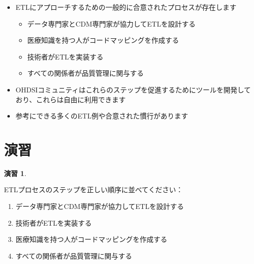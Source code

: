 \documentclass[
  11pt]{book}
\makeatletter
\providecommand{\tightlist}{%
  \setlength{\itemsep}{0pt}\setlength{\parskip}{0pt}}
\newenvironment{kframe}{%
\medskip{}
\setlength{\fboxsep}{.8em}
 \def\at@end@of@kframe{}%
 \ifinner\ifhmode%
  \def\at@end@of@kframe{\end{minipage}}%
  \begin{minipage}{\columnwidth}%
 \fi\fi%
 \def\FrameCommand##1{\hskip\@totalleftmargin \hskip-\fboxsep
 \colorbox{myShadeColor}{##1}\hskip-\fboxsep
     \hskip-\linewidth \hskip-\@totalleftmargin \hskip\columnwidth}%
 \MakeFramed {\advance\hsize-\width
   \@totalleftmargin\z@ \linewidth\hsize
   \@setminipage}}%
 {\par\unskip\endMakeFramed%
 \at@end@of@kframe}
\newenvironment{rmdblock}[1]
  {
  \begin{itemize}
  \renewcommand{\labelitemi}{
    \raisebox{-.7\height}[0pt][0pt]{
      {\setkeys{Gin}{width=3em,keepaspectratio}\texttt{[image: images/\#1]}}
    }
  }
  \setlength{\fboxsep}{1em}
  \begin{kframe}
  \item
  }
  {
  \end{kframe}
  \end{itemize}
  }
\newenvironment{rmdsummary}
  {\begin{rmdblock}{summary}}
  {\end{rmdblock}}
\theoremstyle{definition}
\theoremstyle{definition}
\theoremstyle{definition}
\newtheorem{exercise}{演習}[chapter]
\theoremstyle{definition}
\theoremstyle{remark}
\makeatother
\begin{document}
\begin{rmdsummary}
\begin{itemize}
\item
  ETLにアプローチするための一般的に合意されたプロセスが存在します

  \begin{itemize}
  \tightlist
  \item
    データ専門家とCDM専門家が協力してETLを設計する
  \item
    医療知識を持つ人がコードマッピングを作成する
  \item
    技術者がETLを実装する
  \item
    すべての関係者が品質管理に関与する
  \end{itemize}
\item
  OHDSIコミュニティはこれらのステップを促進するためにツールを開発しており、これらは自由に利用できます
\item
  参考にできる多くのETL例や合意された慣行があります
\end{itemize}
\end{rmdsummary}

\section{演習}\label{ux6f14ux7fd2-2}

\begin{exercise}
\protect\hypertarget{exr:exerciseEtl1}{}\label{exr:exerciseEtl1}

ETLプロセスのステップを正しい順序に並べてください：

\begin{enumerate}
\def\labelenumi{\Alph{enumi})}
\tightlist
\item
  データ専門家とCDM専門家が協力してETLを設計する
\item
  技術者がETLを実装する
\item
  医療知識を持つ人がコードマッピングを作成する
\item
  すべての関係者が品質管理に関与する
\end{enumerate}

\end{exercise}
\end{document}
